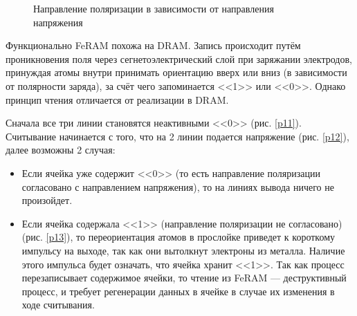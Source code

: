 \documentclass[a4paper]{article}
\begin{document}
\begin{figure}[H]
\begin{center}
\begin{minipage}[h]{0.4\linewidth}
\caption{Направление поляризации в зависимости от направления напряжения}
\label{p14}
\end{minipage}
\end{center}
\end{figure}

Функционально FeRAM похожа на DRAM. Запись происходит путём проникновения поля через сегнетоэлектрический слой при заряжании электродов, принуждая атомы внутри принимать ориентацию вверх или вниз (в зависимости от полярности заряда), за счёт чего запоминается <<1>> или <<0>>. Однако принцип чтения отличается от реализации в DRAM. 

Сначала все три линии становятся неактивными <<0>> (рис. \ref{p11}). Считывание начинается с того, что на 2 линии подается напряжение (рис. \ref{p12}), далее возможны 2 случая:

\begin{itemize}

\item

Если ячейка уже содержит <<0>> (то есть направление поляризации согласовано с направлением напряжения), то на линиях вывода ничего не произойдет.

\item

Если ячейка содержала <<1>> (направление поляризации не согласовано) (рис. \ref{p13}), то переориентация атомов в прослойке приведет к короткому импульсу на выходе, так как они вытолкнут электроны из металла. Наличие этого импульса будет означать, что ячейка хранит <<1>>. Так как процесс перезаписывает содержимое ячейки, то чтение из FeRAM — деструктивный процесс, и требует регенерации данных в ячейке в случае их изменения в ходе считывания.

\end{itemize}
\end{document}
